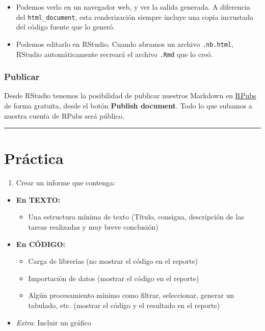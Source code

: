 \documentclass[
]{article}
\providecommand{\tightlist}{%
  \setlength{\itemsep}{0pt}\setlength{\parskip}{0pt}}
\begin{document}
\begin{itemize}
\item
  Podemos verlo en un navegador web, y ver la salida generada. A
  diferencia del \texttt{html\_document}, esta renderización siempre
  incluye una copia incrustada del código fuente que lo generó.
\item
  Podemos editarlo en RStudio. Cuando abramos un archivo
  \texttt{.nb.html}, RStudio automáticamente recreará el archivo
  \texttt{.Rmd} que lo creó.
\end{itemize}

\subsubsection{Publicar}\label{publicar}

Desde RStudio tenemos la posibilidad de publicar nuestros Markdown en
\href{https://rpubs.com/}{RPubs} de forma gratuita, desde el botón
\textbf{Publish document}. Todo lo que subamos a nuestra cuenta de RPubs
será público.

\begin{center}\rule{0.5\linewidth}{0.5pt}\end{center}

\section{Práctica}\label{pruxe1ctica}

\begin{enumerate}
\def\labelenumi{\arabic{enumi})}
\tightlist
\item
  Crear un informe que contenga:
\end{enumerate}

\begin{itemize}
\tightlist
\item
  \textbf{En TEXTO:}

  \begin{itemize}
  \tightlist
  \item
    Una estructura mínima de texto (Título, consigna, descripción de las
    tareas realizadas y muy breve conclusión)
  \end{itemize}
\item
  \textbf{En CÓDIGO:}

  \begin{itemize}
  \tightlist
  \item
    Carga de librerías (no mostrar el código en el reporte)
  \item
    Importación de datos (mostrar el código en el reporte)
  \item
    Algún procesamiento mínimo como filtrar, seleccionar, generar un
    tabulado, etc. (mostrar el código y el resultado en el reporte)
  \end{itemize}
\item
  \emph{Extra}: Incluir un gráfico
\end{itemize}
\end{document}
